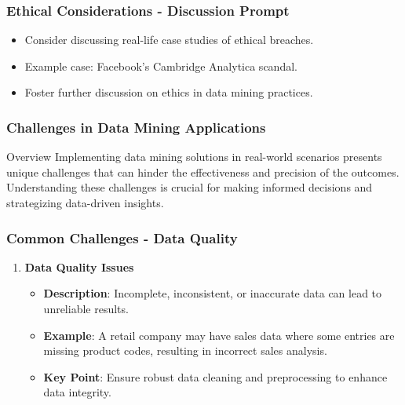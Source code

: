 \documentclass[aspectratio=169]{beamer}
\begin{document}
\begin{frame}[fragile]
    \frametitle{Ethical Considerations - Discussion Prompt}
    \begin{itemize}
        \item Consider discussing real-life case studies of ethical breaches.
        \item Example case: Facebook's Cambridge Analytica scandal.
        \item Foster further discussion on ethics in data mining practices.
    \end{itemize}
\end{frame}

\begin{frame}[fragile]
    \frametitle{Challenges in Data Mining Applications}
    \begin{block}{Overview}
        Implementing data mining solutions in real-world scenarios presents unique challenges that can hinder the effectiveness and precision of the outcomes. Understanding these challenges is crucial for making informed decisions and strategizing data-driven insights.
    \end{block}
\end{frame}

\begin{frame}[fragile]
    \frametitle{Common Challenges - Data Quality}
    \begin{enumerate}
        \item \textbf{Data Quality Issues}
        \begin{itemize}
            \item \textbf{Description}: Incomplete, inconsistent, or inaccurate data can lead to unreliable results.
            \item \textbf{Example}: A retail company may have sales data where some entries are missing product codes, resulting in incorrect sales analysis.
            \item \textbf{Key Point}: Ensure robust data cleaning and preprocessing to enhance data integrity.
        \end{itemize}
    \end{enumerate}
\end{frame}
\end{document}
